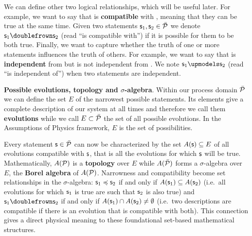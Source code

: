 \documentclass[10pt, onecolumn, longbibliography, nofootinbib]{revtex4-2}
\begin{document}
We can define other two logical relationships, which will be useful later. For example, we want to say that  is \textbf{compatible} with , meaning that they can be true at the same time. Given two statements $\stmt_1, \stmt_2 \in \tdomain[P]$ we denote $\stmt_1 \comp \stmt_2$ (read ``is compatible with'') if it is possible for them to be both true. Finally, we want to capture whether the truth of one or more statements influences the truth of others. For example, we want to say that  is \textbf{independent} from  but is not independent from . We note $\stmt_1 \indep \stmt_2$ (read ``is independent of'') when two statements are independent.

\textbf{Possible evolutions, topology and $\sigma$-algebra}. Within our process domain $\tdomain[P]$ we can define the set $E$ of the narrowest possible statements. Its elements give a complete description of our system at all times and therefore we call them \textbf{evolutions} while we call $E \subset \tdomain[P]$ the set of all possible evolutions. In the Assumptions of Physics framework, $E$ is the set of possibilities.

Every statement $\stmt \in \tdomain[P]$ can now be characterized by the set $A(\stmt) \subseteq E$ of all evolutions compatible with $\stmt$, that is all the evolutions for which $\stmt$ will be true. Mathematically,  $A(\edomain[P])$ is a \textbf{topology} over $E$ while $A(\tdomain[P])$ forms a $\sigma$-algebra over $E$, the \textbf{Borel algebra} of $A(\edomain[P])$. Narrowness and compatibility become set relationships in the $\sigma$-algebra: $\stmt_1 \narrower \stmt_2$ if and only if $A(\stmt_1) \subseteq A(\stmt_2)$ (i.e.~all evolutions for which $\stmt_1$ is true are such that $\stmt_2$ is also true) and $\stmt_1 \comp \stmt_2$ if and only if $A(\stmt_1) \cap A(\stmt_2) \neq \emptyset$ (i.e.~two descriptions are compatible if there is an evolution that is compatible with both). This connection gives a direct physical meaning to these foundational set-based mathematical structures.
\end{document}

